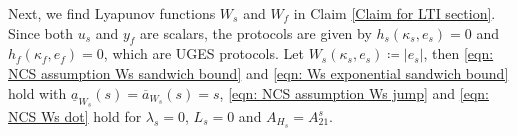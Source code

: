 %
Next, we find Lyapunov functions $W_s$ and $W_f$ in Claim \ref{Claim for LTI section}.
%
%
Since both $u_s$ and $y_f$ are scalars, the protocols are given by $h_s(\kappa_s, e_s) = 0$ and $h_f(\kappa_f, e_f) = 0$, which are UGES protocols. 
Let $W_s(\kappa_s,e_s) \coloneqq |e_s|$, then \eqref{eqn: NCS assumption Ws sandwich bound} and \eqref{eqn: Ws exponential sandwich bound} hold with $\underline{a}_{W_s}(s) = \overline{a}_{W_s}(s) = s$, \eqref{eqn: NCS assumption Ws jump} and \eqref{eqn: NCS Ws dot} hold for $\lambda_s = 0 $, $L_s = 0$ and $A_{H_s} = A_{21}^s$. 
%
